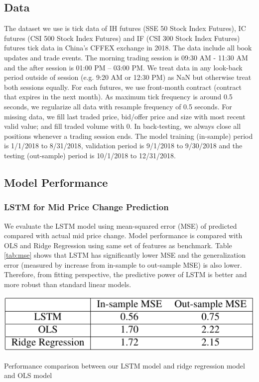 \documentclass{article}
\begin{document}
\subsection{Data}

The dataset we use is tick data of IH futures (SSE 50 Stock Index Futures), IC futures (CSI 500 Stock Index Futures) and IF (CSI 300 Stock Index Futures) futures tick data in China’s CFFEX exchange in 2018. The data include all book updates and trade events. The morning trading session is 09:30 AM - 11:30 AM and the after session is 01:00 PM – 03:00 PM. We treat data in any look-back period outside of session (e.g. 9:20 AM or 12:30 PM) as NaN but otherwise treat both sessions equally. For each futures, we use front-month contract (contract that expires in the next month). As maximum tick frequency is around 0.5 seconds, we regularize all data with resample frequency of 0.5 seconds. For missing data, we fill last traded price, bid/offer price and size with most recent valid value; and fill traded volume with 0. In back-testing, we always close all positions whenever a trading session ends. The model training (in-sample) period is 1/1/2018 to 8/31/2018, validation period is 9/1/2018 to 9/30/2018 and the testing (out-sample) period is 10/1/2018 to 12/31/2018.

\subsection{Model Performance}

\subsubsection{LSTM for Mid Price Change Prediction}

We evaluate the LSTM model using mean-squared error (MSE) of predicted compared with actual mid price change. Model performance is compared with OLS and Ridge Regression using same set of features as benchmark. Table \ref{tab:mse} shows that LSTM has significantly lower MSE and the generalization error (measured by increase from in-sample to out-sample MSE) is also lower. Therefore, from fitting perspective, the predictive power of LSTM is better and more robust than standard linear models.
\begin{table}[h]
	\includegraphics[width=\linewidth]{mse.png}
	\caption{Performance comparison between our LSTM model and ridge regression model and OLS model} 
	\label{tab:mse}
\end{table}
\end{document}
